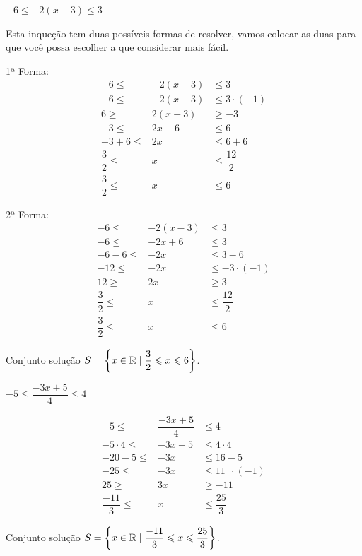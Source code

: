 \begin{exem}
$-6 \leqslant -2(x-3) \leqslant 3$

Esta inqueção tem duas possíveis formas de resolver, vamos colocar as duas para que você possa escolher a que considerar mais fácil.

1ª Forma:
 \begin{eqnarray*}
   -6 \leqslant & -2(x-3) & \leqslant 3 \\
   -6 \leqslant & -2(x-3) & \leqslant 3 \cdot (-1)\\
   6 \geqslant & 2(x-3) & \geqslant -3 \\
   -3 \leqslant & 2x - 6 & \leqslant 6 \\
   -3+6 \leqslant & 2x & \leqslant 6+6 \\
   \dfrac{3}{2} \leqslant & x & \leqslant \dfrac{12}{2} \\
   \dfrac{3}{2} \leqslant & x & \leqslant 6
 \end{eqnarray*}
 
   
2ª Forma:
 \begin{eqnarray*}
    -6 \leqslant & -2(x-3) & \leqslant 3 \\
   -6 \leqslant & -2x + 6 & \leqslant 3 \\
   -6-6 \leqslant & -2x & \leqslant 3-6  \\
   -12 \leqslant & -2x & \leqslant -3 \cdot (-1) \\
   12 \geqslant & 2x & \geqslant 3 \\
   \dfrac{3}{2} \leqslant & x & \leqslant \dfrac{12}{2} \\
   \dfrac{3}{2} \leqslant & x & \leqslant 6
 \end{eqnarray*}
      
  Conjunto solução $S= \left\{x \in \mathbb{R} \mid \dfrac{3}{2} \leqslant x \leqslant 6 \right\}$.

\end{exem} 

\begin{exem}
$-5 \leqslant \dfrac{-3x + 5}{4} \leqslant 4$
  
  \begin{eqnarray*}
  -5 \leqslant & \dfrac{-3x + 5}{4} & \leqslant  4 \\
   -5 \cdot 4  \leqslant & -3x + 5 & \leqslant 4 \cdot 4 \\
   -20 - 5  \leqslant & -3x & \leqslant 16 - 5 \\
   -25  \leqslant & -3x & \leqslant 11  \ \ \cdot(-1) \\
   25  \geqslant & 3x & \geqslant -11 \\
   \dfrac{-11}{3}  \leqslant & x & \leqslant \dfrac{25}{3}
 \end{eqnarray*}
 
      
  Conjunto solução $S= \left\{x \in \mathbb{R} \mid \dfrac{-11}{3} \leqslant x \leqslant \dfrac{25}{3} \right\}$.
\end{exem}
 
